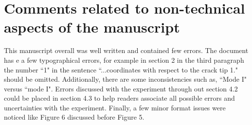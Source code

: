 \documentclass[12pt]{article}
\begin{document}
\section*{Comments related to non-technical aspects of the manuscript} 

This manuscript overall was well written and contained few errors. The document has e a few  typographical errors, for example in section 2 in the third paragraph the number ``1" in the sentence ``...coordinates with respect to the crack tip 1." should be omitted. Additionally, there are some inconsistencies such as,  ``Mode I" versus ``mode I".  Errors discussed with the experiment through out section 4.2 could be placed in section 4.3 to help readers associate all possible errors and uncertainties with the experiment. Finally, a few minor format issues were noticed like Figure 6 discussed before Figure 5.
\end{document}
